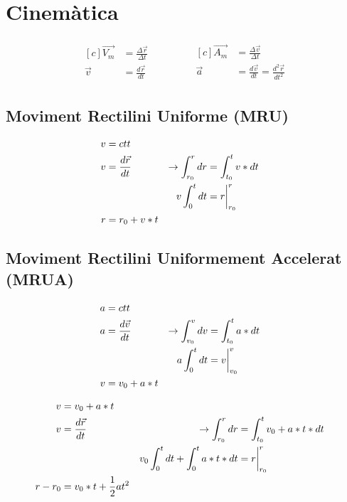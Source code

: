 \pagebreak
{} 

\tableofcontents
\pagebreak
{} 

\section{Cinemàtica}
\label{sec:cinematica}

\begin{align}
    \begin{aligned}[c]
        \vec{V_m}&=\frac{\Delta \vec{r}}{\Delta t} \\
        \vec{v}&=\frac{d \vec{r}}{d t}
    \end{aligned}
    \qquad
    \qquad
    \begin{aligned}[c]
        \vec{A_m}&=\frac{\Delta \vec{v}}{\Delta t}\\
        \vec{a}&=\frac{d \vec{v}}{d t} = \frac{d^2 \vec{r}}{d t^2}
    \end{aligned}
\end{align}

\subsection{Moviment Rectilini Uniforme (MRU)}
\begin{align}\label{equ:Vel. MRU}
    v &= ctt \notag \\
    v &= \frac{d \vec{r}}{d t} &\rightarrow \int_{r_0}^r dr &= \int_{t_0}^t v * dt \notag \\
    && v \int_0^t dt &= r \bigg |_{r_0}^r \notag\\
    r &= r_0 + v*t 
\end{align}

\subsection{Moviment Rectilini Uniformement Accelerat (MRUA)}
\begin{align}\label{equ:Vel. MRUA}
    a &= ctt \notag \\
    a &= \frac{d \vec{v}}{d t} &\rightarrow \int_{v_0}^v dv &= \int_{t_0}^t a * dt \notag \\
    && a \int_0^t dt &= v \bigg |_{v_0}^v \notag\\
    v &= v_0 + a*t 
\end{align}

\begin{align}\label{equ:Pos. MRUA}
    v &= v_0 + a*t  \notag \\
    v &= \frac{d \vec{r}}{d t} &\rightarrow \int_{r_0}^r dr &= \int_{t_0}^t v_0 + a*t * dt \notag \\
    && v_0 \int_0^t dt + \int_0^t a*t*dt &= r \bigg |_{r_0}^r \notag\\
    r - r_0 &= v_0*t+\frac{1}{2}at^2 
\end{align}

